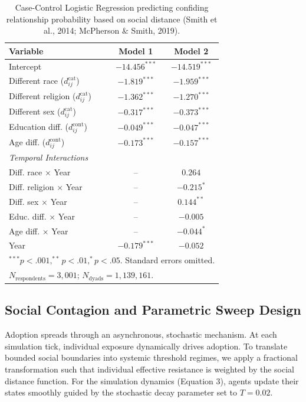 \documentclass[5p,twocolumn,authoryear]{elsarticle}
\begin{document}
\begin{table}[H]
    \centering
    \caption{Case-Control Logistic Regression predicting confiding relationship probability based on social distance (Smith et al., 2014; McPherson \& Smith, 2019).}
    \label{tab:smith2014}
    \begin{tabular}{lcc}
    \toprule
    \textbf{Variable} & \textbf{Model 1} & \textbf{Model 2} \\
    \midrule
    Intercept & $-14.456^{***}$ & $-14.519^{***}$ \\
    Different race ($d^{\mathrm{cat}}_{ij}$) & $-1.819^{***}$ & $-1.959^{***}$ \\
    Different religion ($d^{\mathrm{cat}}_{ij}$) & $-1.362^{***}$ & $-1.270^{***}$ \\
    Different sex ($d^{\mathrm{cat}}_{ij}$) & $-0.317^{***}$ & $-0.373^{***}$ \\
    Education diff. ($d^{\mathrm{cont}}_{ij}$) & $-0.049^{***}$ & $-0.047^{***}$ \\
    Age diff. ($d^{\mathrm{cont}}_{ij}$) & $-0.173^{***}$ & $-0.157^{***}$ \\
    \addlinespace
    \textit{Temporal Interactions} \\
    Diff. race $\times$ Year & -- & $0.264$ \\
    Diff. religion $\times$ Year & -- & $-0.215^{*}$ \\
    Diff. sex $\times$ Year & -- & $0.144^{**}$ \\
    Educ. diff. $\times$ Year & -- & $-0.005$ \\
    Age diff. $\times$ Year & -- & $-0.044^{*}$ \\
    \addlinespace
    Year & $-0.179^{***}$ & $-0.052$ \\
    \bottomrule
    \multicolumn{3}{l}{\footnotesize $^{***} p < .001, ^{**} p < .01, ^{*} p < .05$. Standard errors omitted.} \\
    \multicolumn{3}{l}{\footnotesize $N_{\text{respondents}} = 3,001$; $N_{\text{dyads}} = 1,139,161$.}
    \end{tabular}
\end{table}

\subsection{Social Contagion and Parametric Sweep Design}
Adoption spreads through an asynchronous, stochastic mechanism. At each simulation tick, individual exposure dynamically drives adoption. To translate bounded social boundaries into systemic threshold regimes, we apply a fractional transformation such that individual effective resistance is weighted by the social distance function. For the simulation dynamics (Equation 3), agents update their states smoothly guided by the stochastic decay parameter set to $T = 0.02$.
\end{document}
